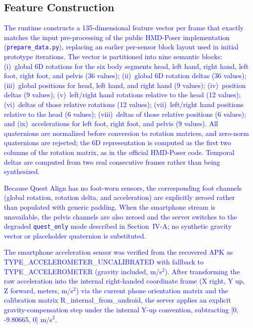 \documentclass[conference]{IEEEtran}
\newcommand{\CC}[1]{\textcolor{blue}{#1}}
\begin{document}
\subsection{Feature Construction}
\CC{The runtime constructs a 135-dimensional feature vector per frame that exactly matches
the input pre-processing of the public HMD-Poser implementation
(\texttt{prepare\_data.py}), replacing an earlier per-sensor block layout used in initial
prototype iterations. The vector is partitioned into nine semantic blocks: (i)~global 6D
rotations for the six body segments head, left hand, right hand, left foot, right foot, and
pelvis (36 values); (ii)~global 6D rotation deltas (36 values); (iii)~global positions for
head, left hand, and right hand (9 values); (iv)~position deltas (9 values); (v)~left/right
hand rotations relative to the head (12 values); (vi)~deltas of those relative rotations
(12 values); (vii)~left/right hand positions relative to the head (6 values); (viii)~deltas
of those relative positions (6 values); and (ix)~accelerations for left foot, right foot,
and pelvis (9 values). All quaternions are normalized before conversion to rotation
matrices, and zero-norm quaternions are rejected; the 6D representation is computed as the
first two columns of the rotation matrix, as in the official HMD-Poser code. Temporal
deltas are computed from two real consecutive frames rather than being synthesized.

Because Quest Align has no foot-worn sensors, the corresponding foot channels (global
rotation, rotation delta, and acceleration) are explicitly zeroed rather than populated
with generic padding. When the smartphone stream is unavailable, the pelvis channels are
also zeroed and the server switches to the degraded \texttt{quest\_only} mode described in
Section~IV-A; no synthetic gravity vector or placeholder quaternion is substituted.

The smartphone acceleration sensor was verified from the recovered APK as TYPE\_ACCELEROMETER\_UNCALIBRATED with fallback to TYPE\_ACCELEROMETER (gravity included, m/s$^2$). After transforming the raw acceleration into the internal right-handed coordinate frame (X right, Y up, Z forward, meters, m/s$^2$) via the current phone orientation matrix and the calibration matrix R\_internal\_from\_android, the server applies an explicit gravity-compensation step under the internal Y-up convention, subtracting [0, -9.80665, 0] m/s$^2$.}
\end{document}
